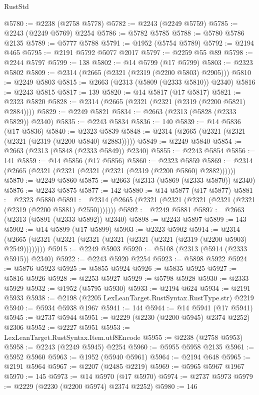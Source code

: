\begin{lexlean}{RustStd}
\begin{coremodule}
@5780 := @2238 (@2758 @5778)
@5782 := @2243 (@2249 @5759)
@5785 := @2243 (@2249 @5769) @2254
@5786 := @5782 @5785
@5788 := @5780 @5786 @2135
@5789 := @5777 @5788
@5791 := @1952 (@5754 @5789)
@5792 := @2194 @465
@5795 := @2191 @5792 @5077 @2017
@5797 := @2259 @55 @89
@5798 := @2244 @5797
@5799 := 138
@5802 := @14 @5799 (@17 @5799)
@5803 := @2323 @5802
@5809 := @2314 (@2665 (@2321 (@2319 (@2200 @5803) @2905)))
@5810 := @2249 @5803
@5815 := @2663 (@2313 (@5809 (@2333 @5810)) @2340)
@5816 := @2243 @5815
@5817 := 139
@5820 := @14 @5817 (@17 @5817)
@5821 := @2323 @5820
@5828 := @2314 (@2665 (@2321 (@2321 (@2319 (@2200 @5821) @2884))))
@5829 := @2249 @5821
@5834 := @2663 (@2313 (@5828 (@2333 @5829)) @2340)
@5835 := @2243 @5834
@5836 := 140
@5839 := @14 @5836 (@17 @5836)
@5840 := @2323 @5839
@5848 := @2314 (@2665 (@2321 (@2321 (@2321 (@2319 (@2200 @5840) @2883)))))
@5849 := @2249 @5840
@5854 := @2663 (@2313 (@5848 (@2333 @5849)) @2340)
@5855 := @2243 @5854
@5856 := 141
@5859 := @14 @5856 (@17 @5856)
@5860 := @2323 @5859
@5869 := @2314 (@2665 (@2321 (@2321 (@2321 (@2321 (@2319 (@2200 @5860) @2882))))))
@5870 := @2249 @5860
@5875 := @2663 (@2313 (@5869 (@2333 @5870)) @2340)
@5876 := @2243 @5875
@5877 := 142
@5880 := @14 @5877 (@17 @5877)
@5881 := @2323 @5880
@5891 := @2314 (@2665 (@2321 (@2321 (@2321 (@2321 (@2321 (@2319 (@2200 @5881) @2550)))))))
@5892 := @2249 @5881
@5897 := @2663 (@2313 (@5891 (@2333 @5892)) @2340)
@5898 := @2243 @5897
@5899 := 143
@5902 := @14 @5899 (@17 @5899)
@5903 := @2323 @5902
@5914 := @2314 (@2665 (@2321 (@2321 (@2321 (@2321 (@2321 (@2321 (@2319 (@2200 @5903) @2549))))))))
@5915 := @2249 @5903
@5920 := @5108 (@2313 (@5914 (@2333 @5915)) @2340)
@5922 := @2243 @5920 @2254
@5923 := @5898 @5922
@5924 := @5876 @5923
@5925 := @5855 @5924
@5926 := @5835 @5925
@5927 := @5816 @5926
@5928 := @2253 @5927
@5929 := @5798 @5928
@5930 := @2333 @5929
@5932 := @1952 (@5795 @5930)
@5933 := @2194 @624
@5934 := @2191 @5933
@5938 := @2198 (@2205 LexLeanTarget.RustSyntax.RustType.str) @2219
@5940 := @5934 @5938 @1967
@5941 := 144
@5944 := @14 @5941 (@17 @5941)
@5945 := @2737 @5944
@5951 := @2229 (@2230 (@2200 @5945) @2374 @2252) @2306
@5952 := @2227 @5951
@5953 := LexLeanTarget.RustSyntax.Item.utf8Encode
@5955 := @2238 (@2758 @5953)
@5958 := @2243 (@2249 @5945) @2254
@5960 := @5955 @5958 @2135
@5961 := @5952 @5960
@5963 := @1952 (@5940 @5961)
@5964 := @2194 @648
@5965 := @2191 @5964
@5967 := @2207 (@2485 @2219)
@5969 := @5965 @5967 @1967
@5970 := 145
@5973 := @14 @5970 (@17 @5970)
@5974 := @2737 @5973
@5979 := @2229 (@2230 (@2200 @5974) @2374 @2252)
@5980 := 146

\end{coremodule}
\end{lexlean}
